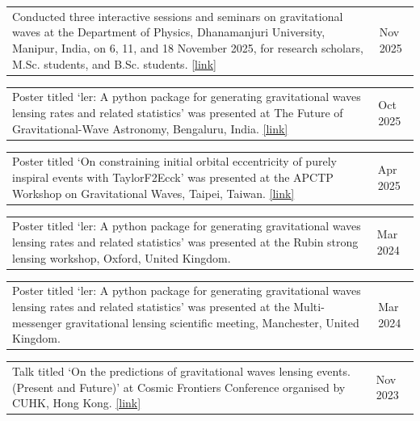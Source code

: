 \documentclass[margin,line]{res}
\begin{document}
\begin{resume}
\begin{tabular}{@{}p{\dimexpr\linewidth-0.62in-3\tabcolsep\relax}p{0.62in}}
Conducted three interactive sessions and seminars on gravitational waves at the Department of Physics, Dhanamanjuri University, Manipur, India, on 6, 11, and 18 November 2025, for research scholars, M.Sc. students, and B.Sc. students. \href{https://drive.google.com/file/d/14nBOgFw5nIWwDLIsz205Mkt3jeQdzXt6/view?usp=sharing}{[link]} & \raggedright Nov 2025
\end{tabular}

\begin{tabular}{@{}p{\dimexpr\linewidth-0.62in-3\tabcolsep\relax}p{0.62in}}
Poster titled `ler: A python package for generating gravitational waves lensing rates and related statistics' was presented at The Future of Gravitational-Wave Astronomy, Bengaluru, India. \href{https://drive.google.com/file/d/1QKTWvBEHxe7wENE2PDzK7uYeg-og99Ye/view?usp=sharing}{[link]} & \raggedright Oct 2025
\end{tabular}

\begin{tabular}{@{}p{\dimexpr\linewidth-0.62in-3\tabcolsep\relax}p{0.62in}}
Poster titled `On constraining initial orbital eccentricity of purely inspiral events with TaylorF2Ecck' was presented at the APCTP Workshop on Gravitational Waves, Taipei, Taiwan. \href{https://drive.google.com/file/d/1-59non-s2W-IOUfH_fRzH7GzmV0HWoWk/view?usp=sharing}{[link]} & \raggedright Apr 2025
\end{tabular}

\begin{tabular}{@{}p{\dimexpr\linewidth-0.62in-3\tabcolsep\relax}p{0.62in}}
Poster titled `ler: A python package for generating gravitational waves lensing rates and related statistics' was presented at the Rubin strong lensing workshop, Oxford, United Kingdom. & \raggedright Mar 2024
\end{tabular}

\begin{tabular}{@{}p{\dimexpr\linewidth-0.62in-3\tabcolsep\relax}p{0.62in}}
Poster titled `ler: A python package for generating gravitational waves lensing rates and related statistics' was presented at the Multi-messenger gravitational lensing scientific meeting, Manchester, United Kingdom. & \raggedright Mar 2024
\end{tabular}

\begin{tabular}{@{}p{\dimexpr\linewidth-0.62in-3\tabcolsep\relax}p{0.62in}}
Talk titled `On the predictions of gravitational waves lensing events.
(Present and Future)' at Cosmic Frontiers Conference organised by CUHK, Hong Kong. \href{https://drive.google.com/file/d/1GRFJcUIEXQxF6iCyLmg-7jZ6lvFdQoMm/view?usp=sharing}{[link]} & \raggedright Nov 2023
\end{tabular}


\end{resume}
\end{document}
